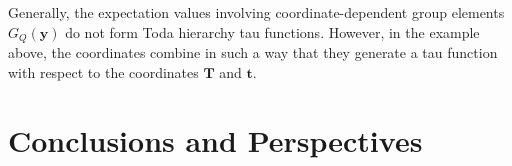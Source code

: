 \documentclass[a4paper,11pt]{amsart}
\begin{document}
Generally, the expectation values involving coordinate-dependent group
elements \(G_{Q}(\bm{y})\) do not form Toda hierarchy tau
functions. However, in the example above, the coordinates combine in
such a way that they generate a tau function with respect to the
coordinates \(\bm{T}\) and \(\bm{t}\).
 

\section{Conclusions and Perspectives}


%
%

\printbibliography
\end{document}
